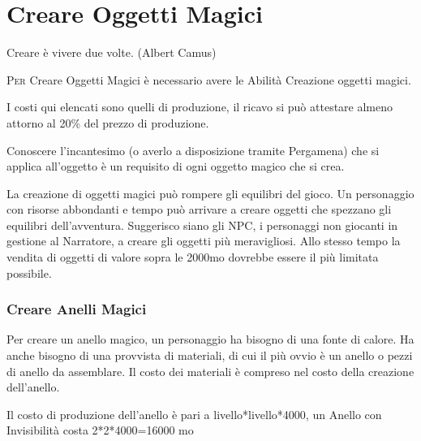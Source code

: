 \section{Creare Oggetti Magici}

\begin{changemargin}{0.3cm}{0.3cm}\begin{enfasi}{
			Creare è vivere due volte. (Albert Camus)}\end{enfasi}\end{changemargin}\medskip

\begin{multicols}{2}

	\label{creare-oggetti-magici}

	\lettrine[lines=2, lhang=0.33, loversize=0.25, findent=1.5em]{P}{er} Creare Oggetti Magici è necessario avere le Abilità Creazione oggetti magici.

	I costi qui elencati sono quelli di produzione, il ricavo si può attestare almeno attorno al 20\% del prezzo di produzione.

	Conoscere l'incantesimo (o averlo a disposizione tramite Pergamena) che si applica all'oggetto è un requisito di ogni oggetto magico che si crea.

	\begin{changemargin}{0.3cm}{0.3cm}\begin{narratore}
			La creazione di oggetti magici può rompere gli equilibri del gioco. Un personaggio con risorse abbondanti e tempo può arrivare a creare oggetti che spezzano gli equilibri dell'avventura. Suggerisco siano gli NPC, i personaggi non giocanti in gestione al Narratore, a creare gli oggetti più meravigliosi. Allo stesso tempo la vendita di oggetti di valore sopra le 2000mo dovrebbe essere il più limitata possibile.
	\end{narratore}\end{changemargin}

	\subsubsection{Creare Anelli Magici}

	Per creare un anello magico, un personaggio ha bisogno di una fonte di calore. Ha anche bisogno di una provvista di materiali, di cui il più ovvio è un anello o pezzi di anello da assemblare. Il costo dei materiali è compreso nel costo della creazione dell'anello.

	Il costo di produzione dell'anello è pari a livello*livello*4000, un Anello con Invisibilità costa 2*2*4000=16000 mo


\end{multicols}
